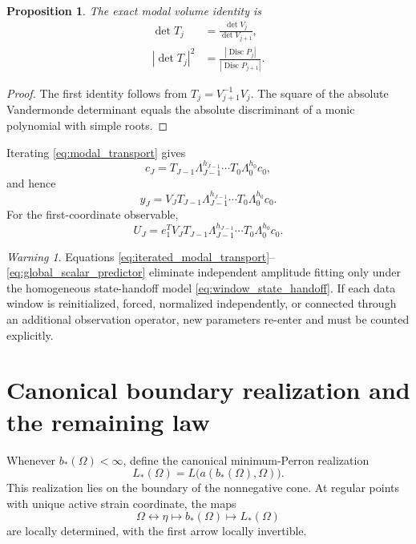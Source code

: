 \documentclass[11pt]{amsart}
\numberwithin{equation}{section}
\theoremstyle{plain}
\newtheorem{proposition}[theorem]{Proposition}
\theoremstyle{definition}
\theoremstyle{remark}
\newtheorem{warning}[theorem]{Warning}
\begin{document}
\begin{proposition}
\label{prop:modal_volume}
The exact modal volume identity is
\begin{align}
\det T_j
&=\frac{\det V_j}{\det V_{j+1}},
\label{eq:transport_determinant}\\
|\det T_j|^2
&=\frac{|\operatorname{Disc}P_j|}
{|\operatorname{Disc}P_{j+1}|}.
\label{eq:discriminant_volume_ratio}
\end{align}
\end{proposition}

\begin{proof}
The first identity follows from $T_j=V_{j+1}^{-1}V_j$.  The square of the absolute Vandermonde determinant equals the absolute discriminant of a monic polynomial with simple roots.
\end{proof}

Iterating \eqref{eq:modal_transport} gives
\begin{equation}
c_J
=T_{J-1}\Lambda_{J-1}^{h_{J-1}}
\cdots
T_0\Lambda_0^{h_0}c_0,
\label{eq:iterated_modal_transport}
\end{equation}
and hence
\begin{equation}
y_J
=V_JT_{J-1}\Lambda_{J-1}^{h_{J-1}}
\cdots
T_0\Lambda_0^{h_0}c_0.
\label{eq:global_state_predictor}
\end{equation}
For the first-coordinate observable,
\begin{equation}
U_J
=e_1^TV_JT_{J-1}\Lambda_{J-1}^{h_{J-1}}
\cdots
T_0\Lambda_0^{h_0}c_0.
\label{eq:global_scalar_predictor}
\end{equation}

\begin{warning}
\label{warn:homogeneous_transport_assumption}
Equations \eqref{eq:iterated_modal_transport}--\eqref{eq:global_scalar_predictor} eliminate independent amplitude fitting only under the homogeneous state-handoff model \eqref{eq:window_state_handoff}.  If each data window is reinitialized, forced, normalized independently, or connected through an additional observation operator, new parameters re-enter and must be counted explicitly.
\end{warning}

\section{Canonical boundary realization and the remaining law}
\label{sec:canonical_boundary}

Whenever $b_*(\Omega)<\infty$, define the canonical minimum-Perron realization
\begin{equation}
L_*(\Omega)=L\bigl(a(b_*(\Omega),\Omega)\bigr).
\label{eq:canonical_boundary_leslie}
\end{equation}
This realization lies on the boundary of the nonnegative cone.  At regular points with unique active strain coordinate, the maps
\begin{equation}
\Omega
\longleftrightarrow
\eta
\longmapsto
b_*(\Omega)
\longmapsto
L_*(\Omega)
\label{eq:canonical_coordinate_chain}
\end{equation}
are locally determined, with the first arrow locally invertible.
\end{document}
